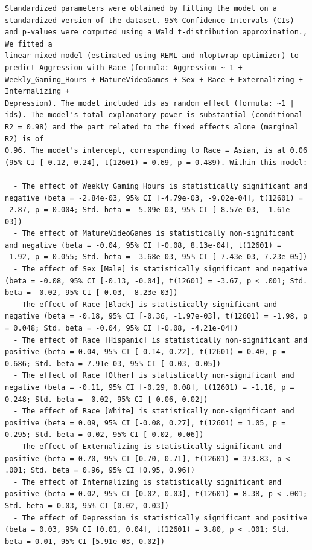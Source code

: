 \documentclass{article}
\begin{document}
\begin{verbatim}
Standardized parameters were obtained by fitting the model on a standardized version of the dataset. 95% Confidence Intervals (CIs) and p-values were computed using a Wald t-distribution approximation., We fitted a
linear mixed model (estimated using REML and nloptwrap optimizer) to predict Aggression with Race (formula: Aggression ~ 1 + Weekly_Gaming_Hours + MatureVideoGames + Sex + Race + Externalizing + Internalizing +
Depression). The model included ids as random effect (formula: ~1 | ids). The model's total explanatory power is substantial (conditional R2 = 0.98) and the part related to the fixed effects alone (marginal R2) is of
0.96. The model's intercept, corresponding to Race = Asian, is at 0.06 (95% CI [-0.12, 0.24], t(12601) = 0.69, p = 0.489). Within this model:

  - The effect of Weekly Gaming Hours is statistically significant and negative (beta = -2.84e-03, 95% CI [-4.79e-03, -9.02e-04], t(12601) = -2.87, p = 0.004; Std. beta = -5.09e-03, 95% CI [-8.57e-03, -1.61e-03])
  - The effect of MatureVideoGames is statistically non-significant and negative (beta = -0.04, 95% CI [-0.08, 8.13e-04], t(12601) = -1.92, p = 0.055; Std. beta = -3.68e-03, 95% CI [-7.43e-03, 7.23e-05])
  - The effect of Sex [Male] is statistically significant and negative (beta = -0.08, 95% CI [-0.13, -0.04], t(12601) = -3.67, p < .001; Std. beta = -0.02, 95% CI [-0.03, -8.23e-03])
  - The effect of Race [Black] is statistically significant and negative (beta = -0.18, 95% CI [-0.36, -1.97e-03], t(12601) = -1.98, p = 0.048; Std. beta = -0.04, 95% CI [-0.08, -4.21e-04])
  - The effect of Race [Hispanic] is statistically non-significant and positive (beta = 0.04, 95% CI [-0.14, 0.22], t(12601) = 0.40, p = 0.686; Std. beta = 7.91e-03, 95% CI [-0.03, 0.05])
  - The effect of Race [Other] is statistically non-significant and negative (beta = -0.11, 95% CI [-0.29, 0.08], t(12601) = -1.16, p = 0.248; Std. beta = -0.02, 95% CI [-0.06, 0.02])
  - The effect of Race [White] is statistically non-significant and positive (beta = 0.09, 95% CI [-0.08, 0.27], t(12601) = 1.05, p = 0.295; Std. beta = 0.02, 95% CI [-0.02, 0.06])
  - The effect of Externalizing is statistically significant and positive (beta = 0.70, 95% CI [0.70, 0.71], t(12601) = 373.83, p < .001; Std. beta = 0.96, 95% CI [0.95, 0.96])
  - The effect of Internalizing is statistically significant and positive (beta = 0.02, 95% CI [0.02, 0.03], t(12601) = 8.38, p < .001; Std. beta = 0.03, 95% CI [0.02, 0.03])
  - The effect of Depression is statistically significant and positive (beta = 0.03, 95% CI [0.01, 0.04], t(12601) = 3.80, p < .001; Std. beta = 0.01, 95% CI [5.91e-03, 0.02])


\end{verbatim}
\end{document}
